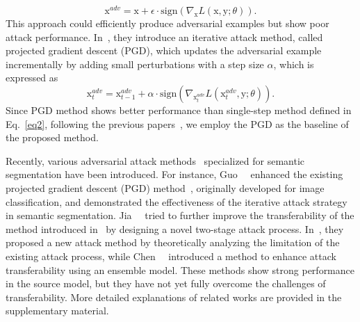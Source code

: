 \begin{equation}
\label{eq2}
    \textrm{x}^{adv} = \textrm{x} + \epsilon\cdot \textrm{sign}(\nabla_\textrm{x}L(\textrm{x}, \textrm{y}; \theta)). 
\end{equation}
This approach could efficiently produce adversarial examples but show poor attack performance. In~\cite{mkadry2017towards}, they introduce an iterative attack method, called projected gradient descent (PGD), which updates the adversarial example incrementally by adding small perturbations with a step size $\alpha$, which is expressed as 
\begin{equation}
\label{eq3}
    \textrm{x}^{adv}_{t} = \textrm{x}^{adv}_{t-1} + \alpha \cdot\textrm{sign}(\nabla_{\textrm{x}^{adv}_{t}} L(\textrm{x}^{adv}_{t}, \textrm{y}; \theta)). 
\end{equation}
Since PGD method shows better performance than single-step method defined in Eq.~\ref{eq2}, following the previous papers~\cite{gu2022segpgd, agnihotri2024cospgd, xie2017adversarial, arnab2018robustness, mkadry2017towards, nokabadi2024trackpgd, savostianova2024low, waghela2024enhancing, huang2023t}, we employ the PGD as the baseline of the proposed method. 

Recently, various adversarial attack methods~\cite{gu2022segpgd, jia2023transegpgd, xie2017adversarial, agnihotri2024cospgd, chen2023rethinking, chen2023adaptive, he2023transferable} specialized for semantic segmentation have been introduced. For instance, Guo~\etal~\cite{gu2022segpgd} enhanced the existing projected gradient descent (PGD) method~\cite{mkadry2017towards}, originally developed for image classification, and demonstrated the effectiveness of the iterative attack strategy in semantic segmentation. Jia~\etal~\cite{jia2023transegpgd} tried to further improve the transferability of the method introduced in~\cite{gu2022segpgd} by designing a novel two-stage attack process. In~\cite{chen2023rethinking}, they proposed a new attack method by theoretically analyzing the limitation of the existing attack process, while Chen~\etal~\cite{chen2023adaptive} introduced a method to enhance attack transferability using an ensemble model. These methods show strong performance in the source model, but they have not yet fully overcome the challenges of transferability. More detailed explanations of related works are provided in the supplementary material.
